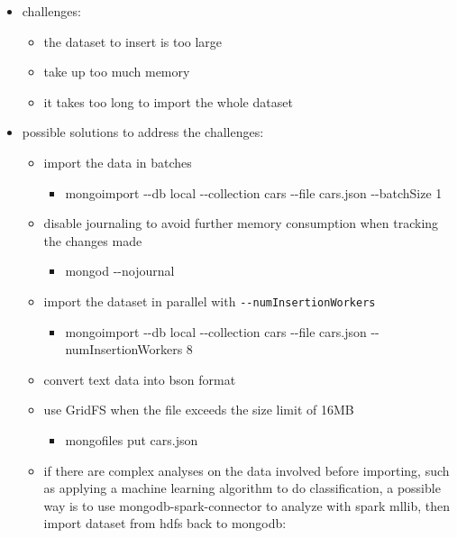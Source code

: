 \documentclass[11pt]{article}
\providecommand{\tightlist}{%
      \setlength{\itemsep}{0pt}\setlength{\parskip}{0pt}}
\begin{document}
    \begin{itemize}
\tightlist
\item
  challenges:

  \begin{itemize}
  \tightlist
  \item
    the dataset to insert is too large
  \item
    take up too much memory
  \item
    it takes too long to import the whole dataset
  \end{itemize}
\item
  possible solutions to address the challenges:

  \begin{itemize}
  \tightlist
  \item
    import the data in batches

    \begin{itemize}
    \tightlist
    \item
      mongoimport -\/-db local -\/-collection cars -\/-file cars.json
      -\/-batchSize 1
    \end{itemize}
  \item
    disable journaling to avoid further memory consumption when tracking
    the changes made

    \begin{itemize}
    \tightlist
    \item
      mongod -\/-nojournal
    \end{itemize}
  \item
    import the dataset in parallel with \texttt{-\/-numInsertionWorkers}

    \begin{itemize}
    \tightlist
    \item
      mongoimport -\/-db local -\/-collection cars -\/-file cars.json
      -\/-numInsertionWorkers 8
    \end{itemize}
  \item
    convert text data into bson format
  \item
    use GridFS when the file exceeds the size limit of 16MB

    \begin{itemize}
    \tightlist
    \item
      mongofiles put cars.json
    \end{itemize}
  \item
    if there are complex analyses on the data involved before importing, such as applying a
    machine learning algorithm to do classification, a possible way is
    to use mongodb-spark-connector to analyze with spark mllib, then
    import dataset from hdfs back to mongodb:
  \end{itemize}
\end{itemize}
\end{document}
